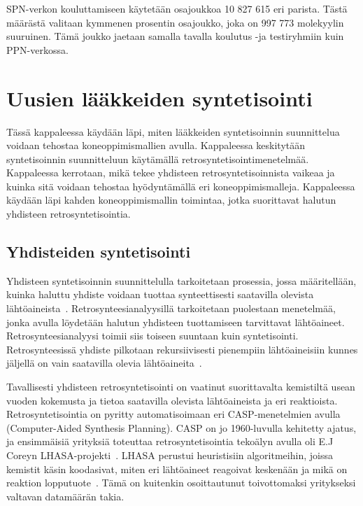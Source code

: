 \documentclass[finnish,twoside,censored,tkt,sw-line]{HYthesisML}
\begin{document}
SPN-verkon kouluttamiseen käytetään osajoukkoa 10 827 615 eri parista.
Tästä määrästä valitaan kymmenen prosentin osajoukko, joka on 997 773 molekyylin suuruinen.
Tämä joukko jaetaan samalla tavalla koulutus -ja testiryhmiin kuin PPN-verkossa.

\chapter{Uusien lääkkeiden syntetisointi}

Tässä kappaleessa käydään läpi, miten lääkkeiden syntetisoinnin suunnittelua voidaan tehostaa koneoppimismallien avulla.
Kappaleessa keskitytään syntetisoinnin suunnitteluun käytämällä retrosyntetisointimenetelmää.
Kappaleessa kerrotaan, mikä tekee yhdisteen retrosyntetisoinnista vaikeaa ja kuinka sitä voidaan tehostaa hyödyntämällä eri koneoppimismalleja.
Kappaleessa käydään läpi kahden koneoppimismallin toimintaa, jotka suorittavat halutun yhdisteen retrosyntetisointia.

\section{Yhdisteiden syntetisointi}

Yhdisteen syntetisoinnin suunnittelulla tarkoitetaan prosessia, jossa määritellään, kuinka haluttu yhdiste voidaan tuottaa synteettisesti saatavilla olevista lähtöaineista~\cite{ColeyConnorW2018MLiC}.
Retrosynteesianalyysillä tarkoitetaan puolestaan menetelmää, jonka avulla löydetään halutun yhdisteen tuottamiseen tarvittavat lähtöaineet.
Retrosynteesianalyysi toimii siis toiseen suuntaan kuin syntetisointi.
Retrosynteesissä yhdiste pilkotaan rekursiivisesti pienempiin lähtöaineisiin kunnes jäljellä on vain saatavilla olevia lähtöaineita~\cite{ECoreyRetrosynthesis}.

Tavallisesti yhdisteen retrosyntetisointi on vaatinut suorittavalta kemistiltä usean vuoden kokemusta ja tietoa saatavilla olevista lähtöaineista ja eri reaktioista.
Retrosyntetisointia on pyritty automatisoimaan eri CASP-menetelmien avulla (Computer-Aided Synthesis Planning).
CASP on jo 1960-luvulla kehitetty ajatus, ja ensimmäisiä yrityksiä toteuttaa retrosyntetisointia tekoälyn avulla oli E.J Coreyn LHASA-projekti~\cite{ColeyConnorW2018MLiC}.
LHASA perustui heuristisiin algoritmeihin, joissa kemistit käsin koodasivat, miten eri lähtöaineet reagoivat keskenään ja mikä on reaktion lopputuote~\cite{LHASA}.
Tämä on kuitenkin osoittautunut toivottomaksi yritykseksi valtavan datamäärän takia.
\end{document}
